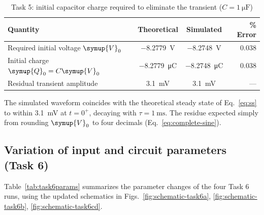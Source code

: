 \documentclass[12pt,a4paper]{article}
\newcommand{\reporttablestyle}{%
	\small
	\renewcommand{\arraystretch}{1.25}%
	\setlength{\tabcolsep}{6pt}%
	\setlength{\arrayrulewidth}{0.4pt}%
	\arrayrulecolor{black!65}}
\begin{document}
	\begin{table}[H]
		\centering
		\caption{Task 5: initial capacitor charge required to eliminate the
			transient ($C = \SI{1}{\micro\farad}$)}
		\label{tab:task5}
		\reporttablestyle
		\begin{tabularx}{\linewidth}{|Y|c|c|r|}
			\hline
			\textbf{Quantity} & \textbf{Theoretical} & \textbf{Simulated} & \textbf{\% Error} \\ \hline
			
			Required initial voltage $\symup{V}_{0}$ & \SI{-8.2779}{\volt} & \SI{-8.2748}{\volt} & $0.038$ \\ \hline
			Initial charge $\symup{Q}_{0} = C \symup{V}_{0}$ & \SI{-8.2779}{\micro\coulomb} & \SI{-8.2748}{\micro\coulomb} & $0.038$ \\ \hline
			Residual transient amplitude & \SI{3.1}{\milli\volt} & \SI{3.1}{\milli\volt} & --- \\ \hline
			
		\end{tabularx}
	\end{table}
	
	The simulated waveform coincides with the theoretical steady state
	of Eq.~\eqref{eq:ss} to within \SI{3.1}{\milli\volt} at $t = 0^{+}$,
	decaying with $\tau = \SI{1}{\milli\second}$. The residue expected
	simply from rounding $\symup{V}_{0}$ to four decimals (Eq.~\eqref{eq:complete-sine}).
	
	\subsection{Variation of input and circuit parameters (Task 6)}
	
	Table~\ref{tab:task6params} summarizes the parameter changes of the
	four Task 6 runs, using the updated schematics in
	Figs.~\ref{fig:schematic-task6a}, \ref{fig:schematic-task6b},
	\ref{fig:schematic-task6cd}.
	
\end{document}
